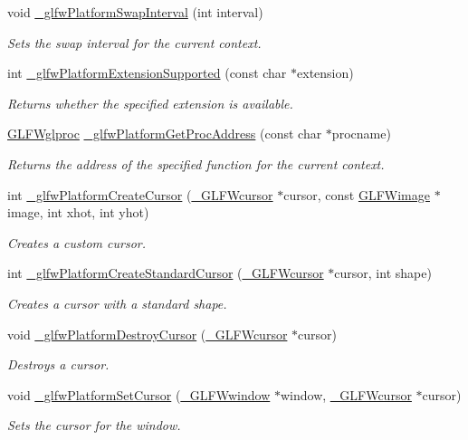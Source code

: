 \begin{DoxyCompactItemize}
void \hyperlink{group__platform_ga06af35966bc5ea06f59cae87aca6c075}{\+\_\+glfw\+Platform\+Swap\+Interval} (int interval)
\begin{DoxyCompactList}\small\item\em Sets the swap interval for the current context. \end{DoxyCompactList}\item 
int \hyperlink{group__platform_ga6d3f2eb832d7f6b428d634051c9fd9c3}{\+\_\+glfw\+Platform\+Extension\+Supported} (const char $\ast$extension)
\begin{DoxyCompactList}\small\item\em Returns whether the specified extension is available. \end{DoxyCompactList}\item 
\hyperlink{group__context_ga3d47c2d2fbe0be9c505d0e04e91a133c}{G\+L\+F\+Wglproc} \hyperlink{group__platform_gaad7519aa101fae555c4bfe0f34f412a2}{\+\_\+glfw\+Platform\+Get\+Proc\+Address} (const char $\ast$procname)
\begin{DoxyCompactList}\small\item\em Returns the address of the specified function for the current context. \end{DoxyCompactList}\item 
int \hyperlink{group__platform_ga38c3eff1120388b2e8cbfe1579518a42}{\+\_\+glfw\+Platform\+Create\+Cursor} (\hyperlink{struct__GLFWcursor}{\+\_\+\+G\+L\+F\+Wcursor} $\ast$cursor, const \hyperlink{structGLFWimage}{G\+L\+F\+Wimage} $\ast$image, int xhot, int yhot)
\begin{DoxyCompactList}\small\item\em Creates a custom cursor. \end{DoxyCompactList}\item 
int \hyperlink{group__platform_gacc56a6e4f2450bc5e3abf681ccdf9b9e}{\+\_\+glfw\+Platform\+Create\+Standard\+Cursor} (\hyperlink{struct__GLFWcursor}{\+\_\+\+G\+L\+F\+Wcursor} $\ast$cursor, int shape)
\begin{DoxyCompactList}\small\item\em Creates a cursor with a standard shape. \end{DoxyCompactList}\item 
void \hyperlink{group__platform_ga7505834ffe07386df151a191ce4677b9}{\+\_\+glfw\+Platform\+Destroy\+Cursor} (\hyperlink{struct__GLFWcursor}{\+\_\+\+G\+L\+F\+Wcursor} $\ast$cursor)
\begin{DoxyCompactList}\small\item\em Destroys a cursor. \end{DoxyCompactList}\item 
void \hyperlink{group__platform_ga52276580374c999cf4babdd49270afa9}{\+\_\+glfw\+Platform\+Set\+Cursor} (\hyperlink{struct__GLFWwindow}{\+\_\+\+G\+L\+F\+Wwindow} $\ast$window, \hyperlink{struct__GLFWcursor}{\+\_\+\+G\+L\+F\+Wcursor} $\ast$cursor)
\begin{DoxyCompactList}\small\item\em Sets the cursor for the window. \end{DoxyCompactList}\end{DoxyCompactItemize}


